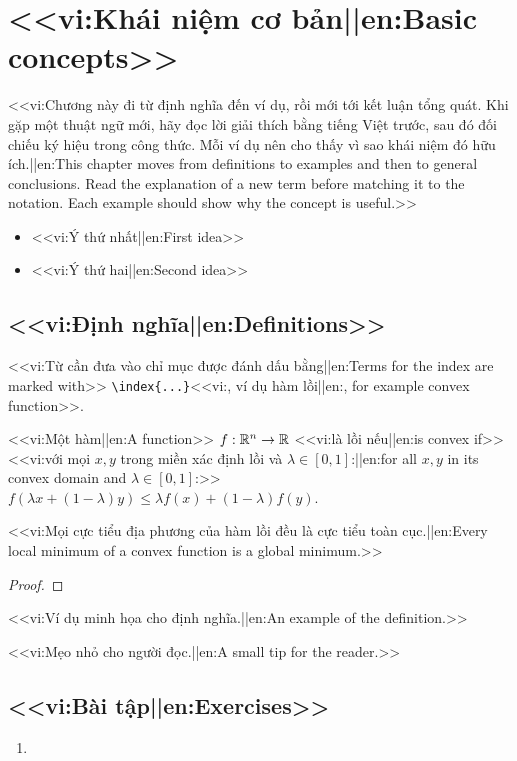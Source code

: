 \chapter{<<vi:Khái niệm cơ bản||en:Basic concepts>>}
\label{ch:basics}
<<vi:Chương này đi từ định nghĩa đến ví dụ, rồi mới tới kết luận tổng quát. Khi gặp một thuật ngữ mới, hãy đọc lời giải thích bằng tiếng Việt trước, sau đó đối chiếu ký hiệu trong công thức. Mỗi ví dụ nên cho thấy vì sao khái niệm đó hữu ích.||en:This chapter moves from definitions to examples and then to general conclusions. Read the explanation of a new term before matching it to the notation. Each example should show why the concept is useful.>>

\begin{summary}
\begin{itemize}
  \item <<vi:Ý thứ nhất||en:First idea>>
  \item <<vi:Ý thứ hai||en:Second idea>>
\end{itemize}
\end{summary}

\section{<<vi:Định nghĩa||en:Definitions>>}
<<vi:Từ cần đưa vào chỉ mục được đánh dấu bằng||en:Terms for the index are marked with>> \verb|\index{...}|<<vi:, ví dụ hàm lồi||en:, for example convex function>>.
\begin{definition}
<<vi:Một hàm||en:A function>> $f:\mathbb{R}^n\to\mathbb{R}$ <<vi:là lồi nếu||en:is convex if>>
<<vi:với mọi $x,y$ trong miền xác định lồi và $\lambda\in[0,1]$:||en:for all $x,y$ in its convex domain and $\lambda\in[0,1]$:>>
$f(\lambda x + (1-\lambda) y) \le \lambda f(x) + (1-\lambda) f(y)$.
\end{definition}

\begin{theorem}
<<vi:Mọi cực tiểu địa phương của hàm lồi đều là cực tiểu toàn cục.||en:Every local minimum of a convex function is a global minimum.>>
\end{theorem}
\begin{proof}
\end{proof}

\begin{examplebox}
<<vi:Ví dụ minh họa cho định nghĩa.||en:An example of the definition.>>
\end{examplebox}

\begin{tip}
<<vi:Mẹo nhỏ cho người đọc.||en:A small tip for the reader.>>
\end{tip}

\section{<<vi:Bài tập||en:Exercises>>}
\begin{enumerate}
  \item {}
\end{enumerate}
